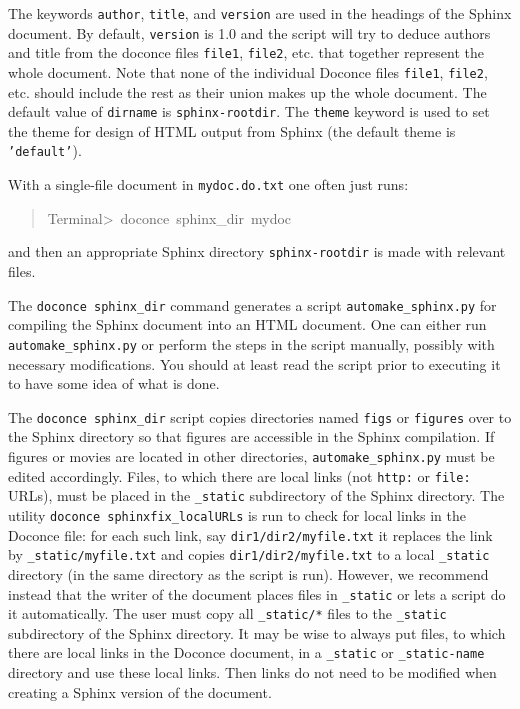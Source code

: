 \documentclass[a4paper]{article}
\begin{document}
The keywords \texttt{author}, \texttt{title}, and \texttt{version} are used in the headings
of the Sphinx document. By default, \texttt{version} is 1.0 and the script
will try to deduce authors and title from the doconce files \texttt{file1},
\texttt{file2}, etc. that together represent the whole document. Note that
none of the individual Doconce files \texttt{file1}, \texttt{file2}, etc. should
include the rest as their union makes up the whole document.
The default value of \texttt{dirname} is \texttt{sphinx-rootdir}. The \texttt{theme}
keyword is used to set the theme for design of HTML output from
Sphinx (the default theme is \texttt{'default'}).

With a single-file document in \texttt{mydoc.do.txt} one often just runs:
%
\begin{quote}{\ttfamily \raggedright \noindent
Terminal>~doconce~sphinx\_dir~mydoc
}
\end{quote}

and then an appropriate Sphinx directory \texttt{sphinx-rootdir} is made with
relevant files.

The \texttt{doconce sphinx\_dir} command generates a script
\texttt{automake\_sphinx.py} for compiling the Sphinx document into an HTML
document.  One can either run \texttt{automake\_sphinx.py} or perform the
steps in the script manually, possibly with necessary modifications.
You should at least read the script prior to executing it to have
some idea of what is done.

The \texttt{doconce sphinx\_dir} script copies directories named \texttt{figs} or
\texttt{figures} over to the Sphinx directory so that figures are accessible
in the Sphinx compilation.  If figures or movies are located in other
directories, \texttt{automake\_sphinx.py} must be edited accordingly.  Files,
to which there are local links (not \texttt{http:} or \texttt{file:} URLs), must be
placed in the \texttt{\_static} subdirectory of the Sphinx directory. The
utility \texttt{doconce sphinxfix\_localURLs} is run to check for local links
in the Doconce file: for each such link, say \texttt{dir1/dir2/myfile.txt} it
replaces the link by \texttt{\_static/myfile.txt} and copies
\texttt{dir1/dir2/myfile.txt} to a local \texttt{\_static} directory (in the same
directory as the script is run).  However, we recommend instead that
the writer of the document places files in \texttt{\_static} or lets a script
do it automatically. The user must copy all \texttt{\_static/*} files to the
\texttt{\_static} subdirectory of the Sphinx directory.  It may be wise to
always put files, to which there are local links in the Doconce
document, in a \texttt{\_static} or \texttt{\_static-name} directory and use these
local links. Then links do not need to be modified when creating a
Sphinx version of the document.
\end{document}
